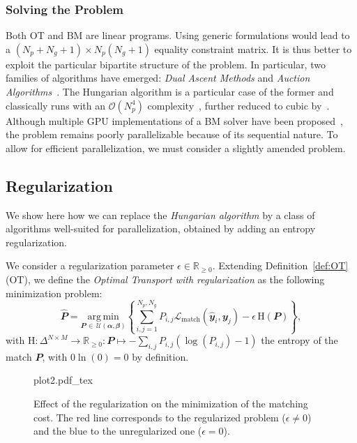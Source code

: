\subsubsection{Solving the Problem}
\label{computational}
Both OT and BM are linear programs. Using generic formulations would lead to a $\left(N_p+N_g+1\right) \times N_p\left(N_g+1\right)$ equality constraint matrix. It is thus better to exploit the particular bipartite structure of the problem. In particular, two families of algorithms have emerged: \emph{Dual Ascent Methods} and \emph{Auction Algorithms}~\cite{peyre2019computational}. The Hungarian algorithm is a particular case of the former and classically runs with an $\mathcal{O}\left(N_p^4\right)$ complexity~\cite{munkres1957algorithmstransportationhungarian}, further reduced to cubic by~\cite{hungarian-cubic}. Although multiple GPU implementations of a BM solver have been proposed~\cite{gpu-bipartite,gpu-hungarian,gpu-matching}, the problem remains poorly parallelizable because of its sequential nature. To allow for efficient parallelization, we must consider a slightly amended problem.

\subsection{Regularization}
We show here how we can replace the \emph{Hungarian algorithm} by a class of algorithms well-suited for parallelization, obtained by adding an entropy regularization.
\begin{definition}
\label{def:rOT}
    We consider a regularization parameter $\epsilon \in \mathbb{R}_{\geq 0}$. Extending Definition~\ref{def:OT} (OT), we define the \emph{Optimal Transport with regularization} as the following minimization problem:
    \begin{equation}
        \hat{\mathbfit{P}} = \underset{\mathbfit{P}\, \in\, \mathcal{U}(\mathbfit{\alpha},\mathbfit{\beta})}{\mathrm{arg\,min}} \left\{\sum_{i,j=1}^{N_p,N_g} P_{i,j}\mathcal{L}_{\text{match}}\left(\hat{\mathbfit{y}}_i, \mathbfit{y}_j\right) - \epsilon \,\mathrm{H}(\mathbfit{P}) \right\},
    \end{equation}
    with  $\mathrm{H}: \Delta^{N \times M} \rightarrow \mathbb{R}_{\geq 0} : \mathbfit{P} \mapsto -\sum_{i,j} P_{i,j}(\log(P_{i,j})-1)$ the entropy of the match $\mathbfit{P}$, with $0 \ln(0) = 0$ by definition.
\end{definition}

\begin{figure}[ht]
\vspace{-2.5em}
    \centering \footnotesize
    {plot2.pdf_tex}
    \vspace{-.7em}
    \caption{\label{fig:ot-reg}Effect of the regularization on the minimization of the matching cost. The red line corresponds to the regularized problem ($\epsilon \neq 0$) and the blue to the unregularized one ($\epsilon = 0$).}%
\end{figure}

